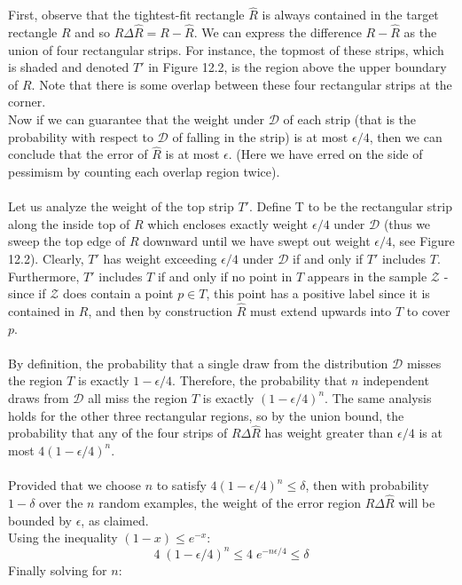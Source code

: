 \documentclass[twoside]{article}
\begin{document}
First, observe that the tightest-fit rectangle $\hat{R}$ is always contained in the target rectangle $R$ and so $R \Delta \hat{R} = R - \hat{R}$. We can express the difference $R-\hat{R}$ as the union of four rectangular strips. For instance, the topmost of these strips, which is shaded and denoted $T'$ in Figure 12.2, is the region above  the upper boundary of $R$. Note that there is some overlap between these four rectangular strips at the corner.\\ Now if we can guarantee that the weight under $\mathcal{D}$ of each strip (that is the probability with respect to $\mathcal{D}$ of falling in the strip) is at most $\epsilon/4$, then we can conclude that the error of $\hat{R}$ is at most $\epsilon$. (Here we have erred on the side of pessimism by counting each overlap region twice).\\\\
Let us analyze the weight of the top strip $T'$. Define T to be the rectangular strip along the inside top of $R$ which encloses exactly weight $\epsilon/4$ under $\mathcal{D}$ (thus we sweep the top edge of $R$ downward until we have swept out weight $\epsilon/4$, see Figure 12.2). Clearly, $T'$
has weight exceeding $\epsilon/4$ under $\mathcal{D}$ if and only if $T'$ includes $T$. Furthermore, $T'$ includes $T$ if and only if no point in $T$ appears in the sample $\mathcal{Z}$ - since if $\mathcal{Z}$ does contain a point $p \in T$, this point has a positive label since it is contained in $R$, and then by construction  $\hat{R}$ must extend upwards into $T$ to cover $p$.\\\\
By definition, the probability that a single draw from the distribution $\mathcal{D}$ misses the region $T$ is exactly $1- \epsilon / 4$. Therefore, the probability that $n$ independent draws from $\mathcal{D}$ all miss the region $T$ is exactly $(1-\epsilon/4)^n$. The same analysis holds for the other three rectangular regions, so by the union bound, the probability that any of the four strips of $R \Delta \hat{R}$ has weight greater than $\epsilon/4$ is at most $4(1-\epsilon/4)^n$.\\\\
Provided that we choose $n$ to satisfy $4(1-\epsilon/4)^n \leq \delta$, then with probability $1-\delta$ over the $n$ random examples, the weight of the error region $R \Delta \hat{R}$ will be bounded by $\epsilon$, as claimed.\\ Using the inequality $(1-x) \leq e^{-x}$:
$$4 \; (1-\epsilon/4)^n \leq 4 \; e^{-n\epsilon/4} \leq \delta$$
Finally solving for $n$:
\end{document}
